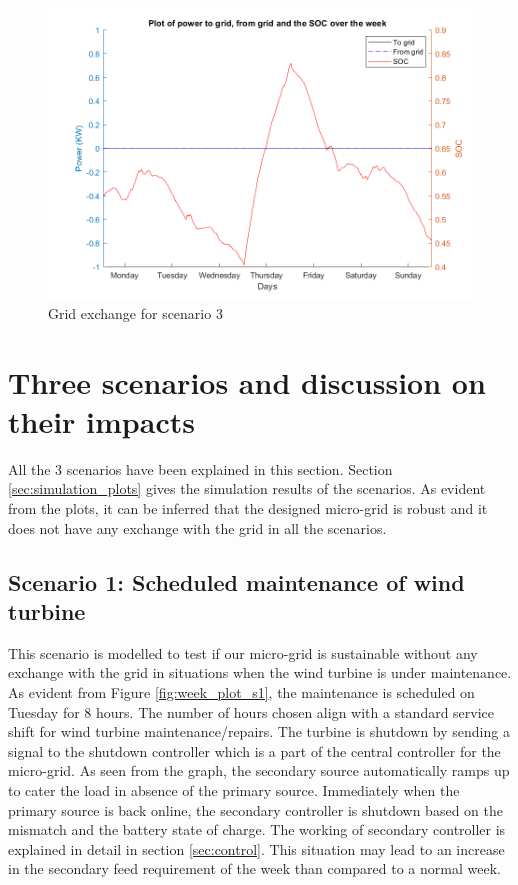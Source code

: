 \begin{figure}[H]
    \centering
    \includegraphics[width=0.7 \linewidth]{Final_report/Images/to_from_SOC_s3.png}
    \caption{Grid exchange for scenario 3}
    \label{fig:grid_s3}
\end{figure}

\section{Three scenarios and discussion on their impacts } \label{scenario_discussion}

All the 3 scenarios have been explained in this section. Section \ref{sec:simulation_plots} gives the simulation results of the scenarios. As evident from the plots, it can be inferred that the designed micro-grid is robust and it does not have any exchange with the grid in all the scenarios.

\subsection{Scenario 1: Scheduled maintenance of wind turbine}
This scenario is modelled to test if our micro-grid is sustainable without any exchange with the grid in situations when the wind turbine is under maintenance. As evident from Figure \ref{fig:week_plot_s1}, the maintenance is scheduled on Tuesday for 8 hours. The number of hours chosen align with a standard service shift for wind turbine maintenance/repairs. The turbine is shutdown by sending a signal to the shutdown controller which is a part of the central controller for the micro-grid. As seen from the graph, the secondary source automatically ramps up to cater the load in absence of the primary source. Immediately when the primary source is back online, the secondary controller is shutdown based on the mismatch and the battery state of charge. The working of secondary controller is explained in detail in section \ref{sec:control}. This situation may lead to an increase in the secondary feed requirement of the week than compared to a normal week.    


